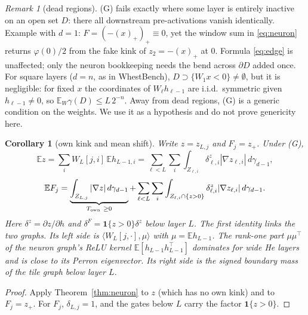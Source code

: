 \documentclass[11pt]{article}
\newtheorem{corollary}[theorem]{Corollary}
\theoremstyle{definition}
\theoremstyle{remark}
\newtheorem{remark}[theorem]{Remark}
\newcommand{\E}{\mathbb E}
\begin{document}
\begin{remark}[dead regions]
(G) fails exactly where some layer is entirely inactive on an open set $D$: there all downstream pre-activations vanish identically. Example with $d=1$: $F=(-(x)_+)_+\equiv0$, yet the window sum in \eqref{eq:neuron} returns $\varphi(0)/2$ from the fake kink of $z_{2}=-(x)_+$ at $0$. Formula \eqref{eq:edge} is unaffected; only the neuron bookkeeping needs the bend across $\partial D$ added once. For square layers ($d=n$, as in WhestBench), $D\supset\{W_1x<0\}\ne\emptyset$, but it is negligible: for fixed $x$ the coordinates of $W_\ell h_{\ell-1}$ are i.i.d.\ symmetric given $h_{\ell-1}\ne0$, so $\E_W\gamma(D)\le L\,2^{-n}$. Away from dead regions, (G) is a generic condition on the weights. We use it as a hypothesis and do not prove genericity here.
\end{remark}

\begin{corollary}[own kink and mean shift]\label{cor:own}
Write $z=z_{L,j}$ and $F_j=z_+$. Under (G),
\[
\E z=\sum_iW_L[j,i]\,\E h_{L-1,i}=\sum_{\ell<L}\sum_i\int_{Z_{\ell,i}}\delta^z_{\ell,i}|\nabla z_{\ell,i}|\,d\gamma_{d-1},
\]
\[
\E F_j=\underbrace{\int_{Z_{L,j}}|\nabla z|\,d\gamma_{d-1}}_{T_{\rm own}\ \ge0}+\sum_{\ell<L}\sum_i\int_{Z_{\ell,i}\cap\{z>0\}}\delta^z_{\ell,i}|\nabla z_{\ell,i}|\,d\gamma_{d-1}.
\]
Here $\delta^z=\partial z/\partial h$ and $\delta^{F}=\mathbf 1\{z>0\}\delta^z$ below layer $L$. The first identity links the two graphs. Its left side is $\langle W_L[j,\cdot],\mu\rangle$ with $\mu=\E h_{L-1}$. The rank-one part $\mu\mu^\top$ of the neuron graph's ReLU kernel $\E[h_{L-1}h_{L-1}^\top]$ dominates for wide He layers and is close to its Perron eigenvector. Its right side is the signed boundary mass of the tile graph below layer $L$.
\end{corollary}

\begin{proof}
Apply Theorem~\ref{thm:neuron} to $z$ (which has no own kink) and to $F_j=z_+$. For $F_j$, $\delta_{L,j}=1$, and the gates below $L$ carry the factor $\mathbf 1\{z>0\}$.
\end{proof}
\end{document}
